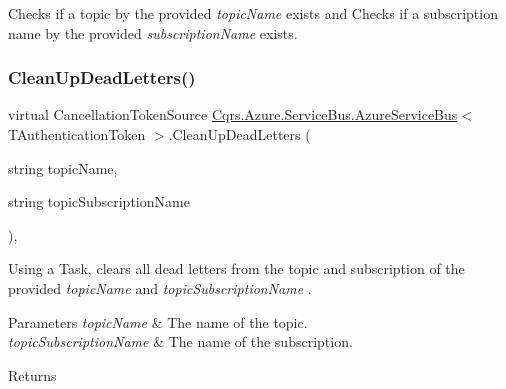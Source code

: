 Checks if a topic by the provided {\itshape topic\+Name}  exists and Checks if a subscription name by the provided {\itshape subscription\+Name}  exists. 

\mbox{\label{classCqrs_1_1Azure_1_1ServiceBus_1_1AzureServiceBus_a8d1d5833d49b7793933825f2a13fb8b7_a8d1d5833d49b7793933825f2a13fb8b7}} 
\subsubsection{\texorpdfstring{Clean\+Up\+Dead\+Letters()}{CleanUpDeadLetters()}}
{\footnotesize\ttfamily virtual Cancellation\+Token\+Source \hyperlink{classCqrs_1_1Azure_1_1ServiceBus_1_1AzureServiceBus}{Cqrs.\+Azure.\+Service\+Bus.\+Azure\+Service\+Bus}$<$ T\+Authentication\+Token $>$.Clean\+Up\+Dead\+Letters (\begin{DoxyParamCaption}\item[{string}]{topic\+Name,  }\item[{string}]{topic\+Subscription\+Name }\end{DoxyParamCaption})\hspace{0.3cm}{\ttfamily [protected]}, {\ttfamily [virtual]}}



Using a Task, clears all dead letters from the topic and subscription of the provided {\itshape topic\+Name}  and {\itshape topic\+Subscription\+Name} . 


\begin{DoxyParams}{Parameters}
{\em topic\+Name} & The name of the topic.\\
\hline
{\em topic\+Subscription\+Name} & The name of the subscription.\\
\hline
\end{DoxyParams}
\begin{DoxyReturn}{Returns}

\end{DoxyReturn}
\mbox{\label{classCqrs_1_1Azure_1_1ServiceBus_1_1AzureServiceBus_abd7070403c94e0b404ffa00c07c94a50_abd7070403c94e0b404ffa00c07c94a50}} 

